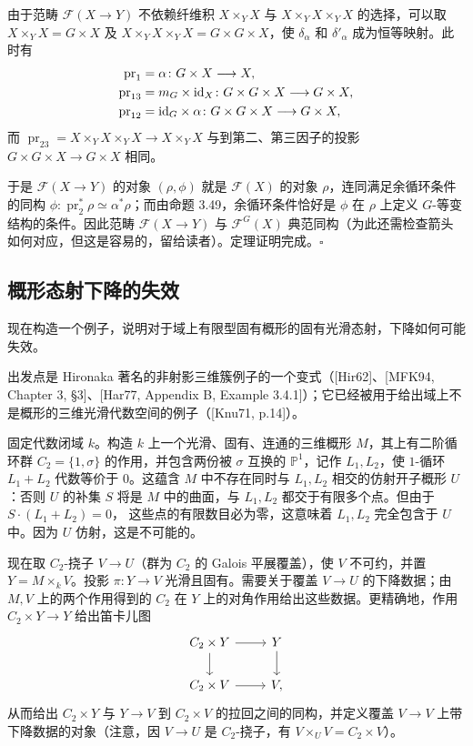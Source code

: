 由于范畴 $\mathcal F(X\to Y)$ 不依赖纤维积 $X\times_Y X$ 与 $X\times_Y X\times_Y X$ 的选择，可以取 $X\times_Y X=G\times X$ 及 $X\times_Y X\times_Y X=G\times G\times X$，使 $\delta_\alpha$ 和 $\delta'_\alpha$ 成为恒等映射。此时有
\[
\begin{aligned}
 \operatorname{pr}_1&=\alpha\colon G\times X\longrightarrow X,\\
 \operatorname{pr}_{13}&=m_G\times\mathrm{id}_X\colon G\times G\times X\longrightarrow G\times X,\\
 \operatorname{pr}_{12}&=\mathrm{id}_G\times\alpha\colon G\times G\times X\longrightarrow G\times X,
\end{aligned}
\]
而 $\operatorname{pr}_{23}=X\times_Y X\times_Y X\to X\times_Y X$ 与到第二、第三因子的投影 $G\times G\times X\to G\times X$ 相同。

于是 $\mathcal F(X\to Y)$ 的对象 $(\rho,\phi)$ 就是 $\mathcal F(X)$ 的对象 $\rho$，连同满足余循环条件的同构 $\phi\colon\operatorname{pr}_2^*\rho\simeq\alpha^*\rho$；而由命题 3.49，余循环条件恰好是 $\phi$ 在 $\rho$ 上定义 $G$-等变结构的条件。因此范畴 $\mathcal F(X\to Y)$ 与 $\mathcal F^G(X)$ 典范同构（为此还需检查箭头如何对应，但这是容易的，留给读者）。定理证明完成。\hfill$\square$

\subsection{概形态射下降的失效}
现在构造一个例子，说明对于域上有限型固有概形的固有光滑态射，下降如何可能失效。

出发点是 Hironaka 著名的非射影三维簇例子的一个变式（[Hir62]、[MFK94, Chapter 3, §3]、[Har77, Appendix B, Example 3.4.1]）；它已经被用于给出域上不是概形的三维光滑代数空间的例子（[Knu71, p.14]）。

固定代数闭域 $k$。构造 $k$ 上一个光滑、固有、连通的三维概形 $M$，其上有二阶循环群 $C_2=\{1,\sigma\}$ 的作用，并包含两份被 $\sigma$ 互换的 $\mathbb P^1$，记作 $L_1,L_2$，使 $1$-循环 $L_1+L_2$ 代数等价于 $0$。这蕴含 $M$ 中不存在同时与 $L_1,L_2$ 相交的仿射开子概形 $U$：否则 $U$ 的补集 $S$ 将是 $M$ 中的曲面，与 $L_1,L_2$ 都交于有限多个点。但由于 $S\cdot(L_1+L_2)=0$，
这些点的有限数目必为零，这意味着 $L_1,L_2$ 完全包含于 $U$ 中。因为 $U$ 仿射，这是不可能的。

现在取 $C_2$-挠子 $V\to U$（群为 $C_2$ 的 Galois 平展覆盖），使 $V$ 不可约，并置 $Y=M\times_k V$。投影 $\pi\colon Y\to V$ 光滑且固有。需要关于覆盖 $V\to U$ 的下降数据；由 $M,V$ 上的两个作用得到的 $C_2$ 在 $Y$ 上的对角作用给出这些数据。更精确地，作用 $C_2\times Y\to Y$ 给出笛卡儿图
\[
\begin{tikzcd}
 C_2\times Y\arrow[r]\arrow[d]&Y\arrow[d]\\
 C_2\times V\arrow[r]&V,
\end{tikzcd}
\]
从而给出 $C_2\times Y$ 与 $Y\to V$ 到 $C_2\times V$ 的拉回之间的同构，并定义覆盖 $V\to V$ 上带下降数据的对象（注意，因 $V\to U$ 是 $C_2$-挠子，有 $V\times_U V=C_2\times V$）。

